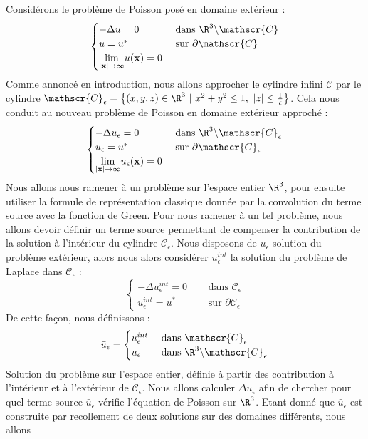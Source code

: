 Considérons le problème de Poisson posé en domaine extérieur :
$$\begin{cases}
    -\Delta u = 0 \quad &\text{ dans } \R^3 \backslash \mathscr{C} \\
    u = u^* &\text{ sur } \partial \mathscr{C} \\
    \underset{|\mathbf{x}| \to \infty}{\lim} u(\mathbf{x}) = 0 
\end{cases}$$
Comme annoncé en introduction, nous allons approcher le cylindre infini $\mathscr{C}$ par le cylindre $\mathscr{C}_{\epsilon} = \big\{ (x,y,z) \in \R^3 \ | \ x^2 + y^2 \leq 1, \ |z| \leq \frac{1}{\epsilon} \big\} $.
Cela nous conduit au nouveau problème de Poisson en domaine extérieur approché :
$$\begin{cases}
    -\Delta u_{\epsilon} = 0 \quad &\text{ dans } \R^3 \backslash \mathscr{C}_{\epsilon} \\
    u_{\epsilon} = u^* &\text{ sur } \partial \mathscr{C}_{\epsilon} \\
    \underset{|\mathbf{x}| \to \infty}{\lim} u_{\epsilon}(\mathbf{x}) = 0 
\end{cases}$$
Nous allons nous ramener à un problème sur l'espace entier $\R^3$, pour ensuite utiliser la formule de représentation classique donnée par la convolution du terme source avec la fonction de Green.
Pour nous ramener à un tel problème, nous allons devoir définir un terme source permettant de compenser la contribution de la solution à l'intérieur du cylindre $\mathscr{C}_{\epsilon}$. Nous disposons de $u_{\epsilon}$ solution du problème extérieur, alors nous 
alors considérer $u_{\epsilon}^{int}$ la solution du problème de Laplace dans $\mathscr{C}_{\epsilon}$ :
$$\begin{cases}
    -\Delta u_{\epsilon}^{int} = 0 \quad &\text{ dans } \mathscr{C}_{\epsilon}\\
    u_{\epsilon}^{int} = u^* \quad &\text{ sur } \partial \mathscr{C}_{\epsilon}
\end{cases}$$ 
De cette façon, nous définissons :
$$\bar{u}_{\epsilon} = 
\begin{cases}
    u^{int}_{\epsilon} &\text{ dans } \mathscr{C}_{\epsilon} \\
    u_{\epsilon} &\text{ dans } \R^3 \backslash \mathscr{C}_{\epsilon}
\end{cases} $$
Solution du problème sur l'espace entier, définie à partir des contribution à l'intérieur et à l'extérieur de $\mathscr{C}_{\epsilon}$.
Nous allons calculer $\Delta \bar{u}_{\epsilon}$ afin de chercher pour quel terme source $\bar{u}_{\epsilon}$ vérifie l'équation de Poisson sur $\R^3$. Etant donné que $\bar{u}_{\epsilon}$ est construite par recollement de deux solutions sur des domaines différents, nous allons
